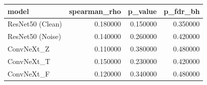 \begin{tabular}{lrrr}
\toprule
model & spearman_rho & p_value & p_fdr_bh \\
\midrule
ResNet50 (Clean) & 0.180000 & 0.150000 & 0.350000 \\
ResNet50 (Noise) & 0.140000 & 0.260000 & 0.420000 \\
ConvNeXt_Z & 0.110000 & 0.380000 & 0.480000 \\
ConvNeXt_T & 0.150000 & 0.230000 & 0.420000 \\
ConvNeXt_F & 0.120000 & 0.340000 & 0.480000 \\
\bottomrule
\end{tabular}
